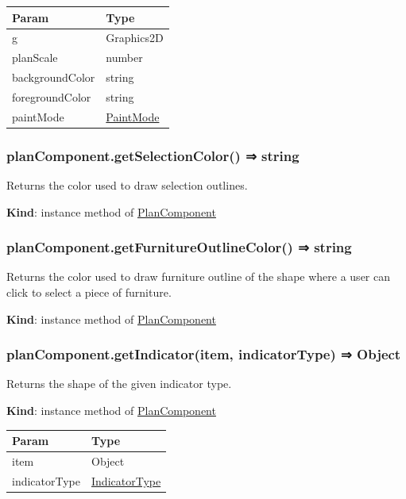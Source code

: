 \documentclass[a4paper]{report}
\begin{document}
\begin{longtable}[]{@{}ll@{}}
\toprule
Param & Type\tabularnewline
\midrule
\endhead
g & Graphics2D\tabularnewline
planScale & number\tabularnewline
backgroundColor & string\tabularnewline
foregroundColor & string\tabularnewline
paintMode &
\protect\hyperlink{PlanComponent.PaintMode}{PaintMode}\tabularnewline
\bottomrule
\end{longtable}

\hypertarget{plancomponent.getselectioncolor-string}{%
\subsubsection{planComponent.getSelectionColor() ⇒
string}\label{plancomponent.getselectioncolor-string}}

Returns the color used to draw selection outlines.

\textbf{Kind}: instance method of
\protect\hyperlink{PlanComponent}{PlanComponent}\\

\hypertarget{plancomponent.getfurnitureoutlinecolor-string}{%
\subsubsection{planComponent.getFurnitureOutlineColor() ⇒
string}\label{plancomponent.getfurnitureoutlinecolor-string}}

Returns the color used to draw furniture outline of the shape where a
user can click to select a piece of furniture.

\textbf{Kind}: instance method of
\protect\hyperlink{PlanComponent}{PlanComponent}\\

\hypertarget{plancomponent.getindicatoritem-indicatortype-object}{%
\subsubsection{planComponent.getIndicator(item, indicatorType) ⇒
Object}\label{plancomponent.getindicatoritem-indicatortype-object}}

Returns the shape of the given indicator type.

\textbf{Kind}: instance method of
\protect\hyperlink{PlanComponent}{PlanComponent}

\begin{longtable}[]{@{}ll@{}}
\toprule
Param & Type\tabularnewline
\midrule
\endhead
item & Object\tabularnewline
indicatorType &
\protect\hyperlink{PlanComponent.IndicatorType}{IndicatorType}\tabularnewline
\bottomrule
\end{longtable}
\end{document}
